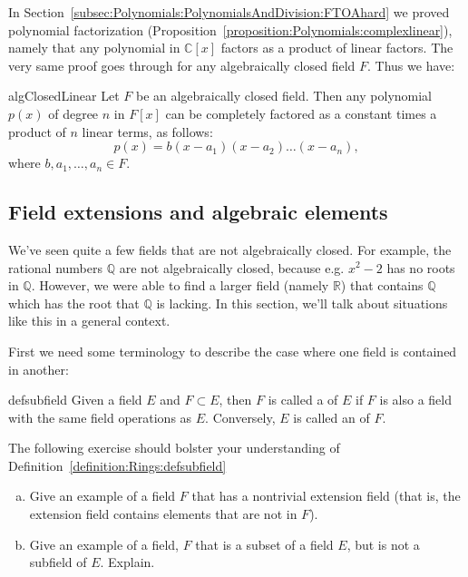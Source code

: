 In Section~\ref{subsec:Polynomials:PolynomialsAndDivision:FTOAhard} we proved polynomial factorization (Proposition~\ref{proposition:Polynomials:complexlinear}), namely that any polynomial in $\mathbb{C}[x]$ factors as a product of linear factors. The very same proof goes through for any algebraically closed field $F$.  Thus we have:

\begin{prop}{algClosedLinear}
Let $F$ be an algebraically closed field. Then any polynomial $p(x)$  of degree $n$ in $F[x]$ can be completely factored as a constant times a product of $n$ linear terms,   as follows:
\begin{equation}
p(x) = b(x -a_1)(x-a_2) \ldots (x - a_n),
\end{equation}
where $b,a_1,\ldots,a_n \in F$.
\end{prop}



\subsection{Field extensions and algebraic elements}
\label{subsec:Rings:PolynomialOverFields:FieldExtension}

We've seen quite a few fields that are not algebraically closed. For example, the rational numbers $\mathbb{Q}$ are not algebraically closed, because e.g. $x^2 - 2$ has no  roots in $\mathbb{Q}$.  However, we were able to find a larger field (namely $\mathbb{R}$) that contains $\mathbb{Q}$ which has the root that $\mathbb{Q}$ is lacking. In this section, we'll talk about situations like this in a general context. 


First we need some  terminology to describe the case where one field is contained in  another:


\begin{defn}{defsubfield}  
Given a field $E$ and $F\subset E$, then $F$ is called a  of $E$ if $F$ is also a field with the same field operations as $E$. Conversely, $E$ is called an  of $F$.
 \end{defn}

The following exercise should  bolster your understanding of Definition~\ref{definition:Rings:defsubfield}

\begin{exercise}{}
\begin{enumerate}[(a)]
\item
Give an example of a field $F$ that has a nontrivial extension field (that is, the extension field contains elements that are not in $F$).
\item
Give an example of a field, $F$ that is a subset of a field $E$, but is not a subfield of $E$. Explain.
\end{enumerate}
\end{exercise}

